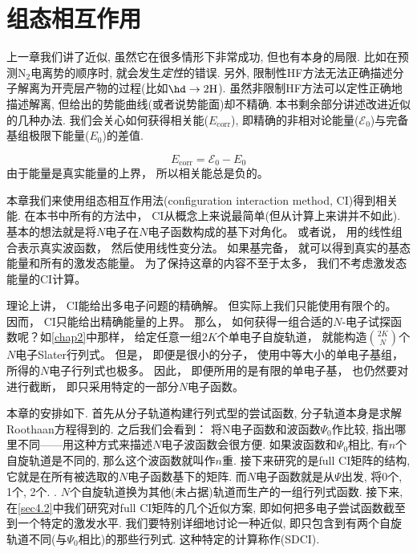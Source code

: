 \chapter{组态相互作用}
\label{ch:4}
上一章我们讲了\hft 近似, 
虽然它在很多情形下非常成功, 
但也有本身的局限. 
\hft 比如在预测$\text{N}_2$电离势的顺序时, 
就会发生\emph{定性}的错误. 
另外, 
限制性HF方法无法正确描述分子解离为开壳层产物的过程(比如$\hd\to2\text{H}$). 
虽然非限制HF方法可以定性正确地描述解离, 
但给出的势能曲线(或者说势能面)却不精确. 
本书剩余部分讲述改进\hft 近似的几种办法. 
我们会关心如何获得相关能($E_\mathrm{corr}$), 
即精确的非相对论能量($\mathscr{E}_0$)与完备基组极限下\hft 能量($E_0$)的差值.

\begin{equation}
E_\mathrm{corr}=\mathscr{E}_0-E_0
\end{equation}
由于\hft 能量是真实能量的上界，
所以相关能总是负的。


本章我们来使用组态相互作用法(configuration interaction method, 
CI)得到相关能. 
在本书中所有的方法中，
CI从概念上来说最简单(但从计算上来讲并不如此). 
基本的想法就是将$N$电子\ha 在$N$电子函数构成的基下对角化。
或者说，
用的线性组合表示真实波函数，
然后使用线性变分法。
如果基完备，
就可以得到真实的基态能量和所有的激发态能量。
为了保持这章的内容不至于太多，
我们不考虑激发态能量的CI计算。



理论上讲，
CI能给出多电子问题的精确解。
但实际上我们只能使用有限个的。
因而，
CI只能给出精确能量的上界。
那么，
如何获得一组合适的$N$-电子试探函数呢？如\autoref{chap2}中那样，
给定任意一组$2K$个单电子自旋轨道，
就能构造$\binom{2K}{N}$个$N$电子Slater行列式。
但是，
即便是很小的分子，
使用中等大小的单电子基组，
所得的$N$电子行列式也极多。
因此，
即便所用的是有限的单电子基，
也仍然要对进行截断，
即只采用特定的一部分$N$电子函数。



本章的安排如下. 
首先从\hft 分子轨道构建行列式型的尝试函数, 
分子轨道本身是求解Roothaan方程得到的. 
之后我们会看到： 将N电子函数和\hft 波函数$\Psi_0$作比较, 
指出哪里不同——用这种方式来描述$N$电子波函数会很方便. 
如果波函数和$\Psi_0$相比, 
有$n$个自旋轨道是不同的, 
那么这个波函数就叫作$n$重. 
接下来研究的是full CI矩阵的结构, 
它就是\ha 在所有被选取的$N$电子函数基下的矩阵. 
而$N$电子函数就是从$\Psi$出发, 
将0个, 
1个, 
2个.
. 
$N$个自旋轨道换为其他(未占据)轨道而生产的一组行列式函数. 
接下来, 
在\autoref{sec4.2}中我们研究对full CI矩阵的几个近似方案, 
即如何把多电子尝试函数截至到一个特定的激发水平. 
我们要特别详细地讨论一种近似, 
即只包含到有两个自旋轨道不同(与$\Psi_0$相比)的那些行列式. 
这种特定的计算称作(SDCI).


